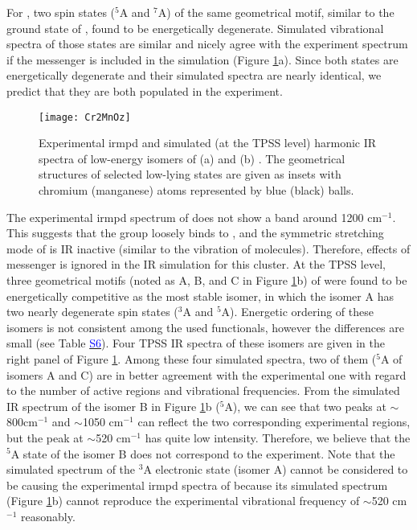 \begin{refsection}
For , two spin states ($^5$A and $^7$A) of the same geometrical motif, similar to the ground state of , found to be energetically degenerate. Simulated vibrational spectra of those states are similar and nicely agree with the experiment spectrum if the  messenger is included in the simulation (Figure \ref{fig:Cr2MnOz}a). Since both states are energetically degenerate and their simulated spectra are nearly identical, we predict that they are both populated in the experiment.

\begin{figure}
	\centering
	\texttt{[image: Cr2MnOz]}
	\caption{Experimental \acrshort{irmpd} and simulated (at the TPSS level) harmonic IR spectra of low-energy isomers of (a)  and (b) . The geometrical structures of selected low-lying states are given as insets with chromium (manganese) atoms represented by blue (black) balls.}
	\label{fig:Cr2MnOz}
\end{figure}


The experimental \acrshort{irmpd} spectrum of  does not show a band around 1200 cm$^{-1}$. This suggests that the  group loosely binds to , and the symmetric stretching mode of  is IR inactive (similar to the vibration of  molecules). Therefore, effects of messenger is ignored in the IR simulation for this cluster. At the TPSS level, three geometrical motifs (noted as A, B, and C in Figure \ref{fig:Cr2MnOz}b) of  were found to be energetically competitive as the most stable isomer, in which the isomer A has two nearly degenerate spin states ($^3$A and $^5$A). Energetic ordering of these isomers is not consistent among the used functionals, however the differences are small (see Table \href{https://github.com/phamlenhan/PhDDissertation/blob/master/Chapter-8SI-Nhan-thesis-CrMnO.pdf}{\textcolor{blue}{S6}}\commenttext{\ref{SI:tbl:Cr2MnO7}}). Four TPSS IR spectra of these isomers are given in the right panel of Figure \ref{fig:Cr2MnOz}. Among these four simulated spectra, two of them ($^5$A of isomers A and C) are in better agreement with the experimental one with regard to the number of active regions and vibrational frequencies. From the simulated IR spectrum of the isomer B in Figure \ref{fig:Cr2MnOz}b ($^5$A), we can see that two peaks at $\sim$ 800cm$^{-1}$ and $\sim$1050 cm$^{-1}$ can reflect the two corresponding experimental regions, but the peak at $\sim$520 cm$^{-1}$ has quite low intensity. Therefore, we believe that the $^5$A state of the isomer B does not correspond to the experiment. Note that the simulated spectrum of the $^3$A electronic state (isomer A) cannot be considered to be causing the experimental \acrshort{irmpd} spectra of  because its simulated spectrum (Figure  \ref{fig:Cr2MnOz}b) cannot reproduce the experimental vibrational frequency of $\sim$520 cm$^{-1}$ reasonably. 





\end{refsection}
